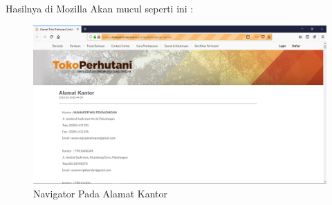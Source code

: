 Hasilnya  di Mozilla Akan mucul seperti ini :
\begin{figure}[h]
\centering
\includegraphics[scale=0.3]{figures/3hasil.PNG}
\caption{Navigator Pada Alamat Kantor}
\end{figure}

